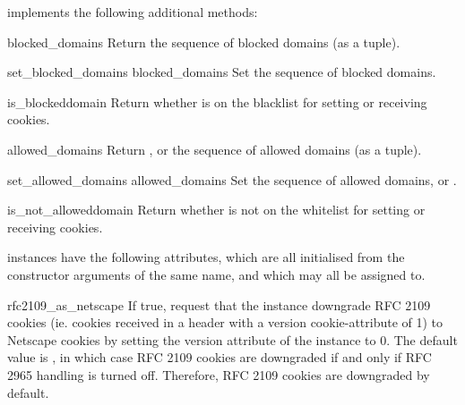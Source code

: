  implements the following additional
methods:

\begin{methoddesc}[DefaultCookiePolicy]{blocked_domains}{}
Return the sequence of blocked domains (as a tuple).
\end{methoddesc}

\begin{methoddesc}[DefaultCookiePolicy]{set_blocked_domains}
  {blocked_domains}
Set the sequence of blocked domains.
\end{methoddesc}

\begin{methoddesc}[DefaultCookiePolicy]{is_blocked}{domain}
Return whether  is on the blacklist for setting or
receiving cookies.
\end{methoddesc}

\begin{methoddesc}[DefaultCookiePolicy]{allowed_domains}{}
Return , or the sequence of allowed domains (as a tuple).
\end{methoddesc}

\begin{methoddesc}[DefaultCookiePolicy]{set_allowed_domains}
  {allowed_domains}
Set the sequence of allowed domains, or .
\end{methoddesc}

\begin{methoddesc}[DefaultCookiePolicy]{is_not_allowed}{domain}
Return whether  is not on the whitelist for setting or
receiving cookies.
\end{methoddesc}

 instances have the following attributes,
which are all initialised from the constructor arguments of the same
name, and which may all be assigned to.

\begin{memberdesc}{rfc2109_as_netscape}
If true, request that the  instance downgrade RFC
2109 cookies (ie. cookies received in a  header
with a version cookie-attribute of 1) to Netscape cookies by setting
the version attribute of the  instance to 0.  The
default value is , in which case RFC 2109 cookies are
downgraded if and only if RFC 2965 handling is turned off.  Therefore,
RFC 2109 cookies are downgraded by default.
\end{memberdesc}

